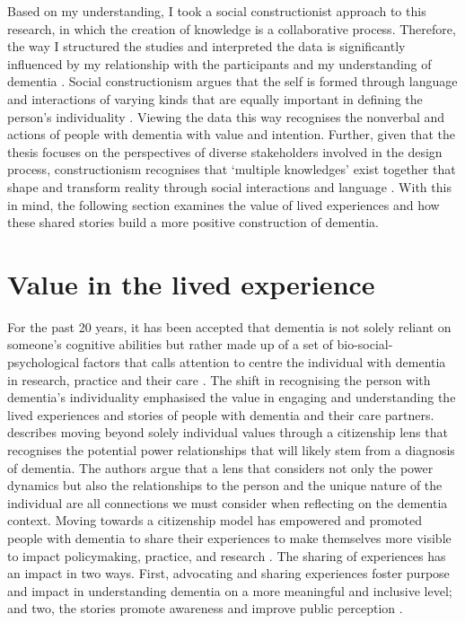 Based on my understanding, I took a social constructionist approach to this research, in which the creation of knowledge is a collaborative process. Therefore, the way I structured the studies and interpreted the data is significantly influenced by my relationship with the participants and my understanding of dementia \citep{surr2006preservation}. Social constructionism argues that the self is formed through language and interactions of varying kinds that are equally important in defining the person's individuality \citep{sarup1996identity}. Viewing the data this way recognises the nonverbal and actions of people with dementia with value and intention. Further, given that the thesis focuses on the perspectives of diverse stakeholders involved in the design process, constructionism recognises that `multiple knowledges' exist together that shape and transform reality through social interactions and language \citep{mckeown2015you}. With this in mind, the following section examines the value of lived experiences and how these shared stories build a more positive construction of dementia.

\section{Value in the lived experience}
\label{Method:experience}
For the past 20 years, it has been accepted that dementia is not solely reliant on someone's cognitive abilities but rather made up of a set of bio-social-psychological factors that calls attention to centre the individual with dementia in research, practice and their care \citep{dewing_personhood_2008}. The shift in recognising the person with dementia's individuality emphasised the value in engaging and understanding the lived experiences and stories of people with dementia and their care partners. \cite{bartlett_personhood_2007} describes moving beyond solely individual values through a citizenship lens that recognises the potential power relationships that will likely stem from a diagnosis of dementia. The authors argue that a lens that considers not only the power dynamics but also the relationships to the person and the unique nature of the individual are all connections we must consider when reflecting on the dementia context. Moving towards a citizenship model has empowered and promoted people with dementia to share their experiences to make themselves more visible to impact policymaking, practice, and research \citep{weetch_involvement_2020}. The sharing of experiences has an impact in two ways. First, advocating and sharing experiences foster purpose and impact in understanding dementia on a more meaningful and inclusive level; and two, the stories promote awareness and improve public perception \citep{reynolds2017stigma}.


